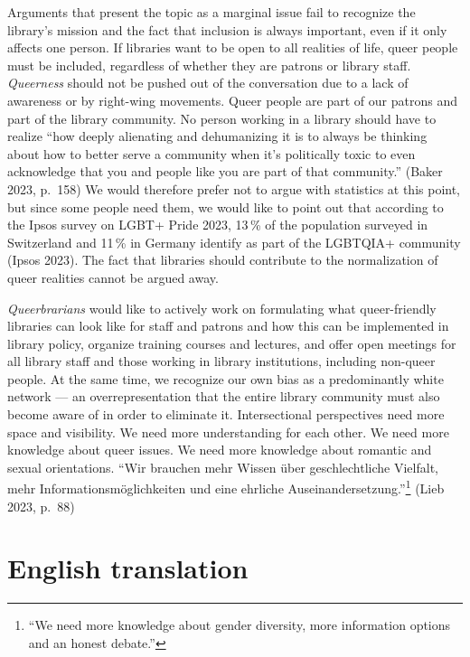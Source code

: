 \documentclass[a4paper,
fontsize=11pt,
oneside,
numbers=noperiodatend,
parskip=half-,
bibliography=totoc,
final
]{scrartcl}
\begin{document}
Arguments that present the topic as a marginal issue fail to recognize
the library's mission and the fact that inclusion is
always important, even if it only affects one person. If libraries want
to be open to all realities of life, queer people must be included,
regardless of whether they are patrons or library staff.
\emph{Queerness} should not be pushed out of the conversation due to a
lack of awareness or by right-wing movements. Queer people are part of
our patrons and part of the library community. No person working in a
library should have to realize \enquote{how deeply alienating and dehumanizing
it is to always be thinking about how to better serve a community when
it's politically toxic to even acknowledge that you and
people like you are part of that community.} (Baker 2023, p.~158) We
would therefore prefer not to argue with statistics at this point, but
since some people need them, we would like to point out that according
to the Ipsos survey on LGBT+ Pride 2023, 13\,\% of the population surveyed
in Switzerland and 11\,\% in Germany identify as part of the LGBTQIA+
community (Ipsos 2023). The fact that libraries should contribute to the
normalization of queer realities cannot be argued away.

\emph{Queerbrarians} would like to actively work on formulating what
queer-friendly libraries can look like for staff and patrons and how
this can be implemented in library policy, organize training courses and
lectures, and offer open meetings for all library staff and those
working in library institutions, including non-queer people. At the same
time, we recognize our own bias as a predominantly white network --- an
overrepresentation that the entire library community must also become
aware of in order to eliminate it. Intersectional perspectives need more
space and visibility. We need more understanding for each other. We need
more knowledge about queer issues. We need more knowledge about romantic
and sexual orientations. \enquote{Wir brauchen mehr Wissen über geschlechtliche
Vielfalt, mehr Informationsmöglichkeiten und eine ehrliche
Auseinandersetzung.}\footnote{\enquote{We need more knowledge about gender
  diversity, more information options and an honest debate.}} (Lieb
2023, p.~88)

\hypertarget{english-translation}{%
\section{English translation}\label{english-translation}}
\end{document}
